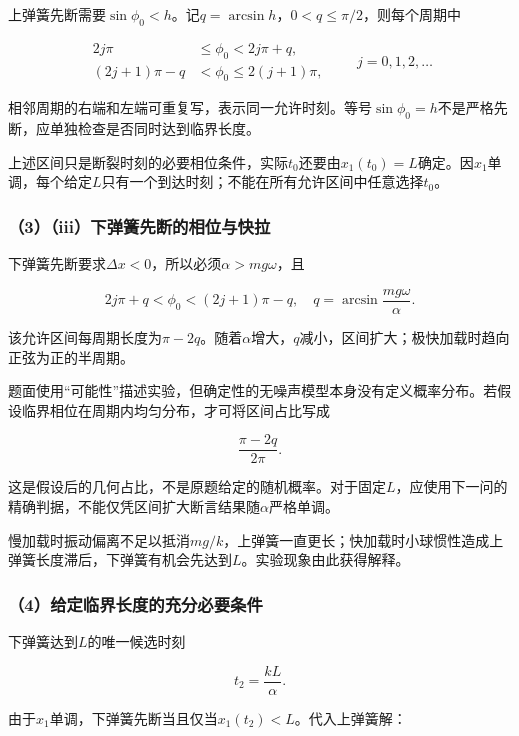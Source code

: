 \documentclass[12pt,a4paper,fontset=fandol]{ctexart}
\begin{document}
上弹簧先断需要\(\sin\phi_0<h\)。记\(q=\arcsin h\)，\(0<q\leq\pi/2\)，则每个周期中

\[
\boxed{
\begin{aligned}
2j\pi&\leq\phi_0<2j\pi+q,\\
(2j+1)\pi-q&<\phi_0\leq2(j+1)\pi,
\end{aligned}\qquad j=0,1,2,\ldots}
\]

相邻周期的右端和左端可重复写，表示同一允许时刻。等号\(\sin\phi_0=h\)不是严格先断，应单独检查是否同时达到临界长度。

上述区间只是断裂时刻的必要相位条件，实际\(t_0\)还要由\(x_1(t_0)=L\)确定。因\(x_1\)单调，每个给定\(L\)只有一个到达时刻；不能在所有允许区间中任意选择\(t_0\)。

\subsubsection{（3）（iii）下弹簧先断的相位与快拉}\label{iiiux4e0bux5f39ux7c27ux5148ux65adux7684ux76f8ux4f4dux4e0eux5febux62c9}

下弹簧先断要求\(\Delta x<0\)，所以必须\(\alpha>mg\omega\)，且

\[
\boxed{
2j\pi+q<\phi_0<(2j+1)\pi-q,\quad
q=\arcsin\frac{mg\omega}{\alpha}}.
\]

该允许区间每周期长度为\(\pi-2q\)。随着\(\alpha\)增大，\(q\)减小，区间扩大；极快加载时趋向正弦为正的半周期。

题面使用``可能性''描述实验，但确定性的无噪声模型本身没有定义概率分布。若假设临界相位在周期内均匀分布，才可将区间占比写成

\[
\frac{\pi-2q}{2\pi}.
\]

这是假设后的几何占比，不是原题给定的随机概率。对于固定\(L\)，应使用下一问的精确判据，不能仅凭区间扩大断言结果随\(\alpha\)严格单调。

慢加载时振动偏离不足以抵消\(mg/k\)，上弹簧一直更长；快加载时小球惯性造成上弹簧长度滞后，下弹簧有机会先达到\(L\)。实验现象由此获得解释。

\subsubsection{（4）给定临界长度的充分必要条件}\label{ux7ed9ux5b9aux4e34ux754cux957fux5ea6ux7684ux5145ux5206ux5fc5ux8981ux6761ux4ef6}

下弹簧达到\(L\)的唯一候选时刻

\[
t_2=\frac{kL}{\alpha}.
\]

由于\(x_1\)单调，下弹簧先断当且仅当\(x_1(t_2)<L\)。代入上弹簧解：
\end{document}
